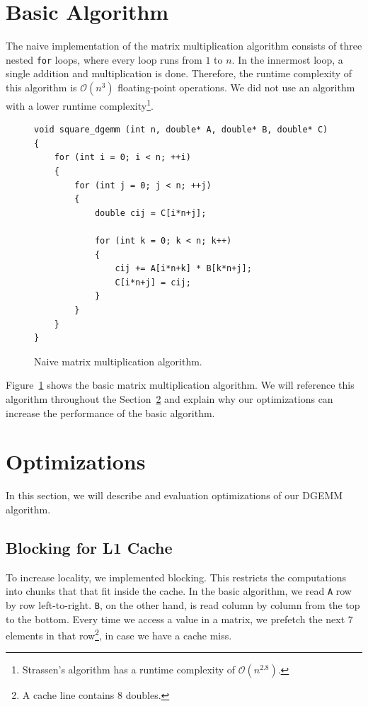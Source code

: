 \documentclass[12pt]{article}
\begin{document}
\section{Basic Algorithm}
The naive implementation of the matrix multiplication algorithm consists of three nested \lstinline{for} loops, where every loop runs from $1$ to $n$. In the innermost loop, a single addition and multiplication is done. Therefore, the runtime complexity of this algorithm is $\mathcal{O}(n^3)$ floating-point operations. We did not use an algorithm with a lower runtime complexity\footnote{Strassen's algorithm has a runtime complexity of $\mathcal{O}(n^{2.8})$.}.

\begin{figure}
\begin{lstlisting}
void square_dgemm (int n, double* A, double* B, double* C)
{
 	for (int i = 0; i < n; ++i)
    {
    	for (int j = 0; j < n; ++j)
    	{
			double cij = C[i*n+j];

			for (int k = 0; k < n; k++)
			{
				cij += A[i*n+k] * B[k*n+j];
				C[i*n+j] = cij;
    		}
    	}
    }
}
\end{lstlisting}
\caption{Naive matrix multiplication algorithm.}
\label{fig:naive_mul}
\end{figure}
Figure~\ref{fig:naive_mul} shows the basic matrix multiplication algorithm. We will reference this algorithm throughout the Section~\ref{sec:optim} and explain why our optimizations can increase the performance of the basic algorithm.

\section{Optimizations}\label{sec:optim}
In this section, we will describe and evaluation optimizations of our DGEMM algorithm.

\subsection{Blocking for L1 Cache}
To increase locality, we implemented blocking.  This restricts the computations into chunks that that fit inside the cache. In the basic algorithm, we read \lstinline{A} row by row left-to-right. \lstinline{B}, on the other hand, is read column by column from the top to the bottom. Every time we access a value in a matrix, we prefetch the next $7$ elements in that row\footnote{A cache line contains $8$ doubles.}, in case we have a cache miss.

\end{document}
